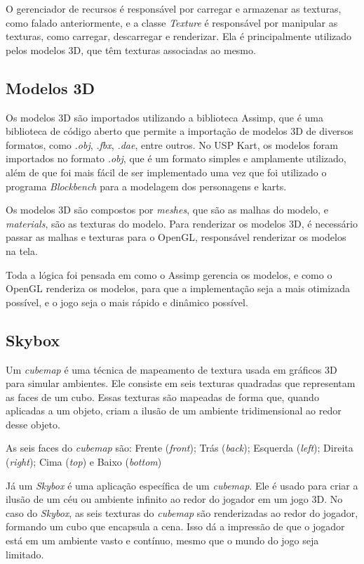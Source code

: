 O gerenciador de recursos é responsável por carregar e armazenar as texturas, como falado anteriormente, e a classe \textit{Texture} é responsável por manipular as texturas, como carregar, descarregar e renderizar. Ela é principalmente utilizado pelos modelos 3D, que têm texturas associadas ao mesmo.


\subsection{Modelos 3D}

Os modelos 3D são importados utilizando a biblioteca Assimp, que é uma biblioteca de código aberto que permite a importação de modelos 3D de diversos formatos, como \textit{.obj}, \textit{.fbx}, \textit{.dae}, entre outros. No USP Kart, os modelos foram importados no formato \textit{.obj}, que é um formato simples e amplamente utilizado, além de que foi mais fácil de ser implementado uma vez que foi utilizado o programa \textit{Blockbench} para a modelagem dos personagens e karts.

Os modelos 3D são compostos por \textit{meshes}, que são as malhas do modelo, e \textit{materials}, são as texturas do modelo. Para renderizar os modelos 3D, é necessário passar as malhas e texturas para o OpenGL, responsável renderizar os modelos na tela.

Toda a lógica foi pensada em como o Assimp gerencia os modelos, e como o OpenGL renderiza os modelos, para que a implementação seja a mais otimizada possível, e o jogo seja o mais rápido e dinâmico possível.

\subsection{Skybox}

Um \textit{cubemap} é uma técnica de mapeamento de textura usada em gráficos 3D para simular ambientes. Ele consiste em seis texturas quadradas que representam as faces de um cubo. Essas texturas são mapeadas de forma que, quando aplicadas a um objeto, criam a ilusão de um ambiente tridimensional ao redor desse objeto.

As seis faces do \textit{cubemap} são: Frente (\textit{front}); Trás (\textit{back}); Esquerda (\textit{left}); Direita (\textit{right}); Cima (\textit{top}) e Baixo (\textit{bottom})

Já um \textit{Skybox} é uma aplicação específica de um \textit{cubemap}. Ele é usado para criar a ilusão de um céu ou ambiente infinito ao redor do jogador em um jogo 3D. No caso do \textit{Skybox}, as seis texturas do \textit{cubemap} são renderizadas ao redor do jogador, formando um cubo que encapsula a cena. Isso dá a impressão de que o jogador está em um ambiente vasto e contínuo, mesmo que o mundo do jogo seja limitado.

